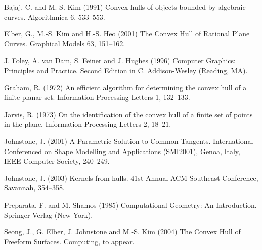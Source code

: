 \documentclass[11pt]{article}
\begin{document}

\begin{thebibliography}{Johnstone 02}

Bajaj, C. and M.-S. Kim (1991)
Convex hulls of objects bounded by algebraic curves.
Algorithmica 6, 533--553.

Elber, G., M.-S. Kim and H.-S. Heo (2001)
The Convex Hull of Rational Plane Curves.
Graphical Models 63, 151--162.

J. Foley, A. van Dam, S. Feiner and J. Hughes (1996)
Computer Graphics: Principles and Practice.
Second Edition in C.
Addison-Wesley (Reading, MA).

Graham, R. (1972)
An efficient algorithm for determining the convex hull of a finite planar set.
Information Processing Letters 1, 132--133.

Jarvis, R. (1973)
On the identification of the convex hull of a finite set of points
in the plane.
Information Processing Letters 2, 18--21.

Johnstone, J. (2001)
A Parametric Solution to Common Tangents.
International Conferenced on Shape Modelling and Applications (SMI2001),
Genoa, Italy, IEEE Computer Society, 240--249.

Johnstone, J. (2003)
Kernels from hulls.
41st Annual ACM Southeast Conference, Savannah, 354--358.

Preparata, F. and M. Shamos (1985)
Computational Geometry: An Introduction.
Springer-Verlag (New York).

Seong, J., G. Elber, J. Johnstone and M.-S. Kim (2004)
The Convex Hull of Freeform Surfaces.
Computing, to appear.

\end{thebibliography}
\end{document}
